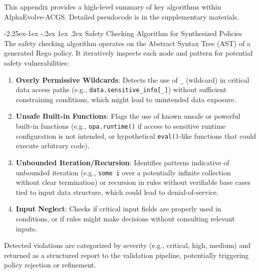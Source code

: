 \documentclass[manuscript,screen,review,anonymous,9pt]{acmart}
\makeatletter
\renewcommand\subsection{\@startsection{subsection}{2}{\z@}%
  {-2.25ex\@plus -1ex \@minus -.2ex}%
  {1ex \@plus .2ex}%
  {\normalfont\large\bfseries}}
\makeatother
\begin{document}
This appendix provides a high-level summary of key algorithms within AlphaEvolve-ACGS. Detailed pseudocode is in the supplementary materials.

\subsection{Safety Checking Algorithm for Synthesized Policies}
The safety checking algorithm operates on the Abstract Syntax Tree (AST) of a generated Rego policy. It iteratively inspects each node and pattern for potential safety vulnerabilities:
\begin{enumerate}[leftmargin=*,itemsep=1pt,parsep=1pt]
    \item \textbf{Overly Permissive Wildcards}: Detects the use of \texttt{\_} (wildcard) in critical data access paths (e.g., \texttt{data.sensitive\_info[\_]}) without sufficient constraining conditions, which might lead to unintended data exposure.
    \item \textbf{Unsafe Built-in Functions}: Flags the use of known unsafe or powerful built-in functions (e.g., \texttt{opa.runtime()} if access to sensitive runtime configuration is not intended, or hypothetical \texttt{eval()}-like functions that could execute arbitrary code).
    \item \textbf{Unbounded Iteration/Recursion}: Identifies patterns indicative of unbounded iteration (e.g., \texttt{some i} over a potentially infinite collection without clear termination) or recursion in rules without verifiable base cases tied to input data structure, which could lead to denial-of-service.
    \item \textbf{Input Neglect}: Checks if critical input fields are properly used in conditions, or if rules might make decisions without consulting relevant inputs.
\end{enumerate}
Detected violations are categorized by severity (e.g., critical, high, medium) and returned as a structured report to the validation pipeline, potentially triggering policy rejection or refinement.
\end{document}
